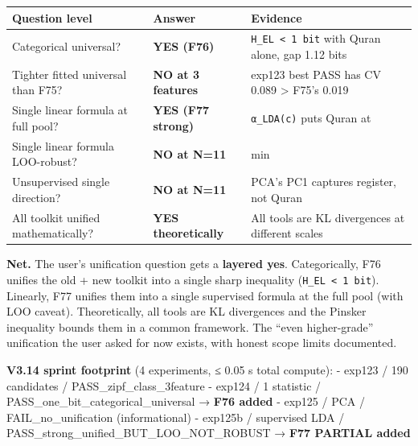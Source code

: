 \documentclass[
]{article}
\newcounter{none} %
\begin{document}
{\def\LTcaptype{none} %
\begin{longtable}[]{@{}
  >{\raggedright\arraybackslash}p{}
  >{\raggedright\arraybackslash}p{}
  >{\raggedright\arraybackslash}p{}@{}}
\toprule\noalign{}
\begin{minipage}[b]{\linewidth}\raggedright
Question level
\end{minipage} & \begin{minipage}[b]{\linewidth}\raggedright
Answer
\end{minipage} & \begin{minipage}[b]{\linewidth}\raggedright
Evidence
\end{minipage} \\
\midrule\noalign{}
\endhead
\bottomrule\noalign{}
\endlastfoot
Categorical universal? & \textbf{YES (F76)} &
\texttt{H\_EL\ \textless{}\ 1\ bit} with Quran alone, gap 1.12 bits \\
Tighter fitted universal than F75? & \textbf{NO at 3 features} & exp123
best PASS has CV 0.089 \textgreater{} F75's 0.019 \\
Single linear formula at full pool? & \textbf{YES (F77 strong)} &
\texttt{α\_LDA(c)} puts Quran at \\
Single linear formula LOO-robust? & \textbf{NO at N=11} & min \\
Unsupervised single direction? & \textbf{NO at N=11} & PCA's PC1
captures register, not Quran \\
All toolkit unified mathematically? & \textbf{YES theoretically} & All
tools are KL divergences at different scales \\
\end{longtable}
}

\textbf{Net.} The user's unification question gets a \textbf{layered
yes}. Categorically, F76 unifies the old + new toolkit into a single
sharp inequality (\texttt{H\_EL\ \textless{}\ 1\ bit}). Linearly, F77
unifies them into a single supervised formula at the full pool (with LOO
caveat). Theoretically, all tools are KL divergences and the Pinsker
inequality bounds them in a common framework. The ``even higher-grade''
unification the user asked for now exists, with honest scope limits
documented.

\textbf{V3.14 sprint footprint} (4 experiments, ≤ 0.05 s total compute):
- exp123 / 190 candidates / PASS\_zipf\_class\_3feature - exp124 / 1
statistic / PASS\_one\_bit\_categorical\_universal → \textbf{F76 added}
- exp125 / PCA / FAIL\_no\_unification (informational) - exp125b /
supervised LDA / PASS\_strong\_unified\_BUT\_LOO\_NOT\_ROBUST →
\textbf{F77 PARTIAL added}
\end{document}
